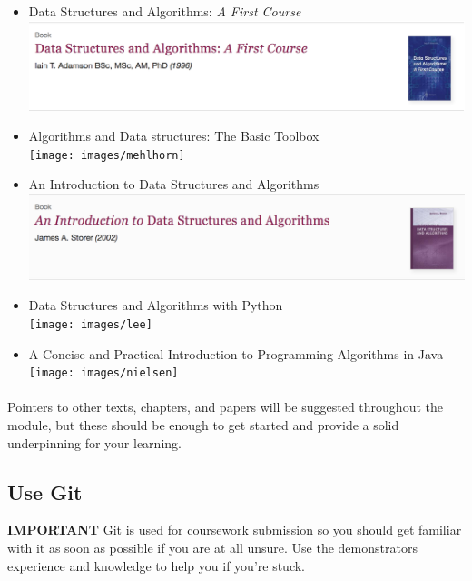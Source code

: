 \documentclass[10pt, a4paper, twosize]{article}
\begin{document}
\begin{itemize}

\item Data Structures and Algorithms: \emph{A First Course}\\
\includegraphics[width=.8\textwidth]{images/adamson}

\item Algorithms and Data structures: The Basic Toolbox\\
\texttt{[image: images/mehlhorn]}

\item An Introduction to Data Structures and Algorithms\\
\includegraphics[width=.8\textwidth]{images/storer}

\item Data Structures and Algorithms with Python\\
\texttt{[image: images/lee]}

\item A Concise and Practical Introduction to Programming Algorithms in Java\\
\texttt{[image: images/nielsen]}

\end{itemize}

\paragraph{} Pointers to other texts, chapters, and papers will be suggested throughout the module, but these should be enough to get started and provide a solid underpinning for your learning.

\subsection{Use Git}

\begin{framed}
\textbf{IMPORTANT} Git is used for coursework submission so you should get familiar with it as soon as possible if you are at all unsure. Use the demonstrators experience and knowledge to help you if you're stuck.
\end{framed}
\end{document}

